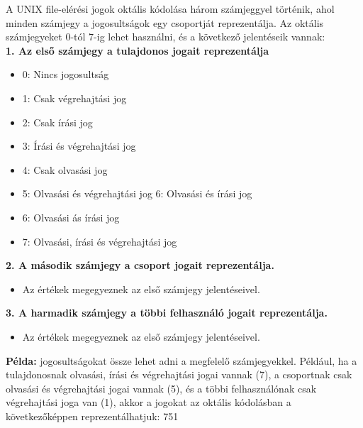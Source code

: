 \documentclass[12pt,a4paper]{article}
\begin{document}
            \begin{tcolorbox}[colback=blue!5!white,colframe=blue!50!black,title= 37. Ismertesse a UNIX file-elérési jogok oktális kódolását!]
                                        A UNIX file-elérési jogok oktális kódolása három számjeggyel történik, ahol minden számjegy a jogosultságok egy csoportját reprezentálja. Az oktális számjegyeket 0-tól 7-ig lehet használni, és a következő jelentéseik vannak:\\
                                        \textbf{1. Az első számjegy a tulajdonos jogait reprezentálja}    
                                        \begin{itemize}
                                            \item 0: Nincs jogosultság
                                            \item 1: Csak végrehajtási jog
                                            \item 2: Csak írási jog
                                            \item 3: Írási és végrehajtási jog
                                            \item 4: Csak olvasási jog
                                            \item 5: Olvasási és végrehajtási jog 6: Olvasási és írási jog
                                            \item 6: Olvasási ás írási jog
                                            \item 7: Olvasási, írási és végrehajtási jog
                                        \end{itemize}
                                        \textbf{2. A második számjegy a csoport jogait reprezentálja.}
                                        \begin{itemize}
                                            \item Az értékek megegyeznek az első számjegy jelentéseivel.
                                        \end{itemize}
                                        \textbf{3. A harmadik számjegy a többi felhasználó jogait reprezentálja.}
                                        \begin{itemize}
                                            \item Az értékek megegyeznek az első számjegy jelentéseivel.
                                        \end{itemize}
                                        \textbf{Példa:} jogosultságokat össze lehet adni a megfelelő számjegyekkel. Például, ha a tulajdonosnak olvasási, írási és végrehajtási jogai vannak (7), a csoportnak csak olvasási és végrehajtási jogai vannak (5), és a többi felhasználónak csak végrehajtási joga van (1), akkor a jogokat az oktális kódolásban a következőképpen reprezentálhatjuk: 751\\
            \end{tcolorbox}
                                    
\end{document}
